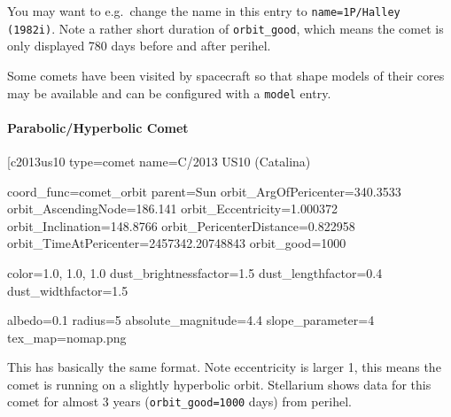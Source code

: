 You may want to e.g.\ change the name in this entry
to \texttt{name=1P/Halley (1982i)}. Note a rather short
duration of \texttt{orbit\_good}, which means the comet is only displayed 780
days before and after perihel.

Some comets have been visited by spacecraft so that shape models of their cores 
may be available and can be configured with a \texttt{model} entry.

\paragraph{Parabolic/Hyperbolic Comet}
\label{sec:ssystem.ini:Comet:Parabolic}

\begin{configfile}
[c2013us10%
type=comet
name=C/2013 US10 (Catalina)

coord_func=comet_orbit
parent=Sun 
orbit_ArgOfPericenter=340.3533
orbit_AscendingNode=186.141
orbit_Eccentricity=1.000372
orbit_Inclination=148.8766
orbit_PericenterDistance=0.822958
orbit_TimeAtPericenter=2457342.20748843
orbit_good=1000

color=1.0, 1.0, 1.0
dust_brightnessfactor=1.5
dust_lengthfactor=0.4
dust_widthfactor=1.5

albedo=0.1
radius=5
absolute_magnitude=4.4
slope_parameter=4
tex_map=nomap.png
\end{configfile}

This has basically the same format. Note eccentricity is larger 1,
this means the comet is running on a slightly hyperbolic
orbit. Stellarium shows data for this comet for almost 3 years
(\texttt{orbit\_good=1000} days) from perihel.





